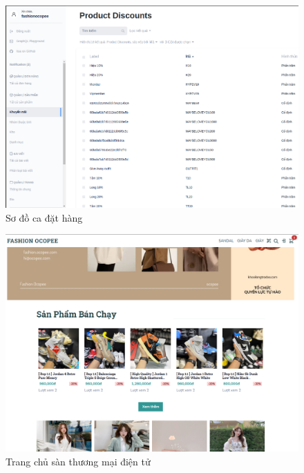 \begin{figure}[h!]
	\begin{center}	
		\includegraphics[width=\textwidth]{./results/discount}
		\caption{Sơ đồ ca đặt hàng}
	\end{center}
\end{figure}


\begin{figure}[h!]
	\begin{center}	
		\includegraphics[width=\textwidth]{./results/homepage}
		\caption{Trang chủ sàn thương mại điện tử}
	\end{center}
\end{figure}

